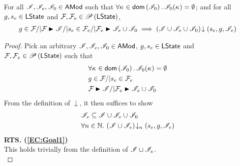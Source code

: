 \newpage	
%
\begin{lemma}\label{lem:extend-closure}
%
For all $\mathscr{I}, \mathscr{I}_{e}, \mathscr{I}_{0} \in \textsf{AMod}$ such that $\forall \kappa_{} \in \textsf{dom}\left( \mathscr{I}_0 \right).\, \mathscr{I}_0(\kappa_{}) = \emptyset$; and for all $g, s_e \in \textsf{LState}$ and $\mathcal{F}_{}, \mathcal{F}_{e} \in \mathscr{P}\left(\textsf{LState} \right)$,
\[
\begin{array}{l l}
	g \in \fence{} /| \fence{} \strictfences \lmod /| s_e \in \fence{e} /| \fence{e} \strictfences \lmod_e \cup \lmod_0
	\implies  \extendsAM{\lmod \cup \lmod_{e} \cup \lmod_0}{s_{e}}{g}{\lmod_{e}}
\end{array}
\]
%
\begin{proof} Pick an arbitrary $\mathscr{I}, \mathscr{I}_e, \mathscr{I}_0 \in \textsf{AMod}$, $g, s_e \in \textsf{LState}$ and $\mathcal{F}_{}, \mathcal{F}_{e} \in \mathscr{P}\left(\textsf{LState} \right)$ such that 
%
\begin{align}
	& \for{\ca{} \in \dom{\lmod_0}} \lmod_0(\ca{}) = \emptyset \label{EC:Ass0}\\
	& g \in \fence{} /|  s_e \in \fence{e}   \label{EC:Ass1}\\
	& \fence{} \strictfences \lmod /| \fence{e} \strictfences \lmod_e \cup \lmod_0 \label{EC:Ass2}
\end{align} 
%
From the definition of $\downarrow$, it then suffices to show
%
\begin{align}
	& \mathscr{I}_e \subseteq \mathscr{I} \cup \mathscr{I}_e \cup \mathscr{I}_0 \label{EC:Goal1}\\
	& \forall n \in \mathbb{N}.\,  \left(\mathscr{I} \cup \mathscr{I}_e\right) \!\downarrow_{n} \left(s_e, g, \mathscr{I}_e\right) \label{EC:Goal2}
\end{align}
%
\noindent\textbf{RTS. (\ref{EC:Goal1})} \\
This holds trivially from the definition of $\mathscr{I} \cup \mathscr{I}_e$.\\


\end{proof}
\end{lemma}
